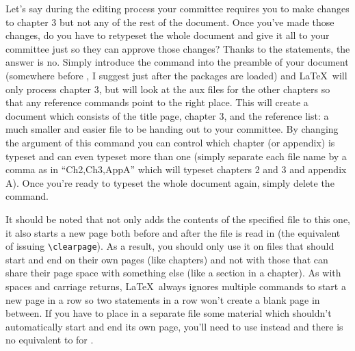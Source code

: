 Let's say during the editing process your committee requires you to make changes to chapter 3 but not any of the rest of the document.  Once you've made those changes, do you have to retypeset the whole document and give it all to your committee just so they can approve those changes?  Thanks to the \verb== statements, the answer is no.  Simply introduce the command \verb== into the preamble of your document (somewhere before \verb==, I suggest just after the packages are loaded) and \LaTeX\ will only process chapter 3, but will look at the aux files for the other chapters so that any reference commands point to the right place.  This will create a document which consists of the title page, chapter 3, and the reference list: a much smaller and easier file to be handing out to your committee.  By changing the argument of this command you can control which chapter (or appendix) is typeset and can even typeset more than one (simply separate each file name by a comma as in ``Ch2,Ch3,AppA'' which will typeset chapters 2 and 3 and appendix A).  Once you're ready to typeset the whole document again, simply delete the \verb== command.

It should be noted that \verb== not only adds the contents of the specified file to this one, it also starts a new page both before and after the file is read in (the equivalent of issuing \verb=\clearpage=).  As a result, you should only use it on files that should start and end on their own pages (like chapters) and not with those that can share their page space with something else (like a section in a chapter).  As with spaces and carriage returns, \LaTeX\ always ignores multiple commands to start a new page in a row so two \verb== statements in a row won't create a blank page in between.  If you have to place in a separate file some material which shouldn't automatically start and end its own page, you'll need to use \verb== instead and there is no equivalent to \verb== for \verb==.

\endinput